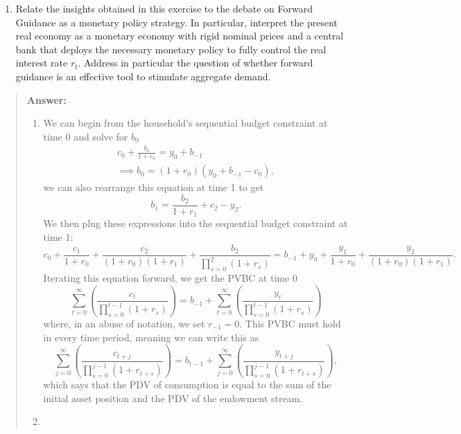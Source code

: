 \begin{exercise}
\begin{enumerate}
\item Relate the insights obtained in this exercise to the debate on Forward Guidance as a monetary policy strategy. In particular, interpret  the present real economy 
as a monetary economy with rigid nominal prices and a central bank that deploys the necessary monetary policy  to fully control  the real interest rate $r_t$.  Address in particular the question of whether forward guidance  is an effective tool to stimulate aggregate demand. 
\end{enumerate}
\begin{quote}
{\bf Answer:}
\begin{enumerate}
\item We can begin from the household's sequential budget constraint at time 0 and solve for $b_0$
\begin{gather*}
    c_0 + \frac{b_0}{1+r_0} = y_0 +b_{-1} \\
    \implies b_0 = (1+r_0)(y_0+b_{-1}-c_0),
\end{gather*}
we can also rearrange this equation at time 1 to get
\begin{equation*}
    b_1 = \frac{b_2}{1+r_1} + c_2 - y_2.
\end{equation*}
We then plug these expressions into the sequential budget constraint at time 1:
\begin{equation*}
    c_0 + \frac{c_1}{1+r_0} + \frac{c_2}{(1+r_0)(1+r_1)} + \frac{b_2}{\displaystyle\prod_{s=0}^2 (1+r_s)} = b_{-1} + y_0 + \frac{y_1}{1+r_0} + \frac{y_2}{(1+r_0)(1+r_1)}.
\end{equation*}
Iterating this equation forward, we get the PVBC at time 0
\begin{equation*}
\sum_{t=0}^{\infty} 
\left(
\frac
{c_{t}}
{\displaystyle \prod_{s=0}^{t-1} (1+r_{s})} 
\right)
=
b_{-1}
+
\sum_{t=0}^{\infty} 
\left(
\frac
{y_{t} }
{\displaystyle \prod_{s=0}^{t-1} (1+r_{s})} 
\right)
\end{equation*}
where, in an abuse of notation, we set $r_{-1}=0$. This PVBC must hold in every time period, meaning we can write this as 
\begin{equation}
\sum_{j=0}^{\infty} 
\left(
\frac
{c_{t+j}}
{\displaystyle \prod_{s=0}^{j-1} (1+r_{t+s})} 
\right)
=
b_{t-1}
+
\sum_{j=0}^{\infty} 
\left(
\frac
{y_{t+j} }
{\displaystyle \prod_{s=0}^{j-1} (1+r_{t+s})} 
\right),
\end{equation}
which says that the PDV of consumption is equal to the sum of the initial asset position and the PDV of the endowment stream.
\item 

\end{enumerate}
\end{quote}
\end{exercise}
